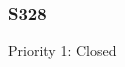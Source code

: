 
%
%




\clearpage
\subsubsection{S328}

\begin{packed_items}
\item Priority 1: Closed
\end{packed_items}

\clearpage
